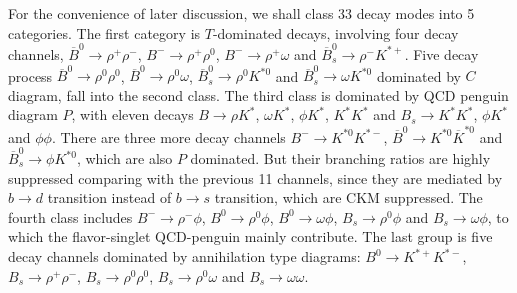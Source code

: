 \documentclass[11pt]{article}
\begin{document}
For the convenience of later discussion, we shall class 33 decay modes into 5 categories. The first category is $T$-dominated decays, involving four decay channels, $\overline B^0 \to \rho^+\rho^-$, $B^- \to \rho^+\rho^0$, $B^- \to \rho^+\omega$ and $\overline B_s^0 \to \rho^-K^{*+}$. Five decay process $\overline B^0 \to \rho^0\rho^0$, $\overline B^0 \to \rho^0\omega$,  $\overline B_s^0 \to \rho^0K^{*0}$ and $\overline B_s^0 \to \omega K^{*0}$ dominated by $C$ diagram,   fall into the second class. The third class is dominated by QCD penguin diagram $P$, with eleven decays $B\to\rho K^*$, $\omega K^*$, $\phi K^*$, $K^*K^*$ and $B_s\to K^* K^*$, $\phi K^*$ and $\phi\phi$. There are three more decay channels $B^-\to K^{*0} K^{*-}$, $\overline B^0\to K^{*0}\overline K^{*0}$   and $\overline B_s^0\to \phi K^{*0}$, which are also $P$ dominated. But their branching ratios are highly suppressed comparing with the previous 11 channels, since they are mediated by $b\to d$ transition instead of $b\to s$ transition, which are CKM suppressed.
The fourth class includes $B^-\to \rho^-\phi$, $B^0\to \rho^0\phi$, $B^0\to \omega\phi$, $B_s\to \rho^0\phi$ and $B_s\to \omega\phi$, to which the flavor-singlet QCD-penguin mainly contribute. The last group is five  decay channels dominated by annihilation type diagrams: $B^0 \to K^{*+}K^{*-}$, $B_s \to \rho^{+}\rho^{-}$, $B_s \to \rho^{0}\rho^{0}$, $B_s \to \rho^{0}\omega$ and  $B_s \to \omega\omega$.
\end{document}
